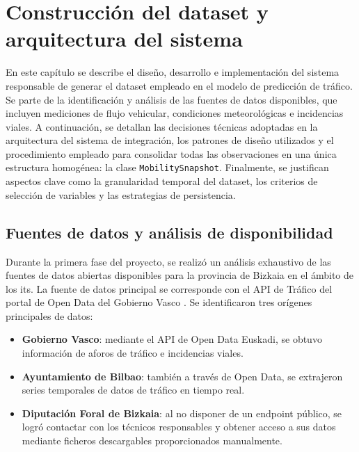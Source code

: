 \section{Construcción del dataset y arquitectura del sistema}
\label{sec:dataset_arquitectura}

%
%

En este capítulo se describe el diseño, desarrollo e implementación del sistema responsable de generar el dataset empleado en el modelo de predicción de tráfico. Se parte de la identificación y análisis de las fuentes de datos disponibles, que incluyen mediciones de flujo vehicular, condiciones meteorológicas e incidencias viales. A continuación, se detallan las decisiones técnicas adoptadas en la arquitectura del sistema de integración, los patrones de diseño utilizados y el procedimiento empleado para consolidar todas las observaciones en una única estructura homogénea: la clase \texttt{MobilitySnapshot}. Finalmente, se justifican aspectos clave como la granularidad temporal del dataset, los criterios de selección de variables y las estrategias de persistencia.


\subsection{Fuentes de datos y análisis de disponibilidad}

Durante la primera fase del proyecto, se realizó un análisis exhaustivo de las fuentes de datos abiertas disponibles para la provincia de Bizkaia en el ámbito de los \acrshort{its}. La fuente de datos principal se corresponde con el API de Tráfico del portal de Open Data del Gobierno Vasco \cite{apiTraffic}. Se identificaron tres orígenes principales de datos:

\begin{itemize}
	\item \textbf{Gobierno Vasco}: mediante el API de Open Data Euskadi, se obtuvo información de aforos de tráfico e incidencias viales.
	\item \textbf{Ayuntamiento de Bilbao}: también a través de Open Data, se extrajeron series temporales de datos de tráfico en tiempo real.
	\item \textbf{Diputación Foral de Bizkaia}: al no disponer de un endpoint público, se logró contactar con los técnicos responsables y obtener acceso a sus datos mediante ficheros descargables proporcionados manualmente.
\end{itemize}

